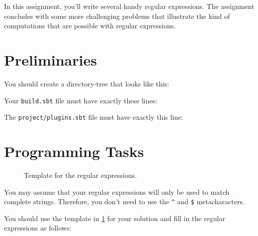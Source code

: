 
In this assignment, you'll write several handy regular expressions. The assignment concludes with some more challenging problems that illustrate the kind of computations that are possible with regular expressions.

\section{Preliminaries}

You should create a directory-tree that looks like this:


Your \texttt{build.sbt} file must have exactly these lines:


The \texttt{project/plugins.sbt} file must have exactly this line:


\section{Programming Tasks}

\begin{figure}
\caption{Template for the regular expressions.}
\label{regex_template}
\end{figure}

You may assume that your regular expressions will only be used to match complete strings. Therefore, you don't need to use the \texttt{^} and \texttt{\$} metacharacters.

You should use the template in \cref{regex_template} for your solution and fill in the regular expressions as follows:

